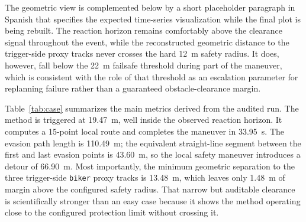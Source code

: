 \documentclass[journal,twoside,web]{ieeecolor}
\begin{document}
The geometric view is complemented below by a short placeholder paragraph in Spanish that specifies the expected time-series visualization while the final plot is being rebuilt. The reaction horizon remains comfortably above the clearance signal throughout the event, while the reconstructed geometric distance to the trigger-side proxy tracks never crosses the hard \SI{12}{\meter} safety radius. It does, however, fall below the \SI{22}{\meter} failsafe threshold during part of the maneuver, which is consistent with the role of that threshold as an escalation parameter for replanning failure rather than a guaranteed obstacle-clearance margin.


Table~\ref{tab:case} summarizes the main metrics derived from the audited run. The method is triggered at \SI{19.47}{\meter}, well inside the observed reaction horizon. It computes a 15-point local route and completes the maneuver in \SI{33.95}{\second}. The evasion path length is \SI{110.49}{\meter}; the equivalent straight-line segment between the first and last evasion points is \SI{43.60}{\meter}, so the local safety maneuver introduces a detour of \SI{66.90}{\meter}. Most importantly, the minimum geometric separation to the three trigger-side \texttt{biker} proxy tracks is \SI{13.48}{\meter}, which leaves only \SI{1.48}{\meter} of margin above the configured safety radius. That narrow but auditable clearance is scientifically stronger than an easy case because it shows the method operating close to the configured protection limit without crossing it.
\end{document}
